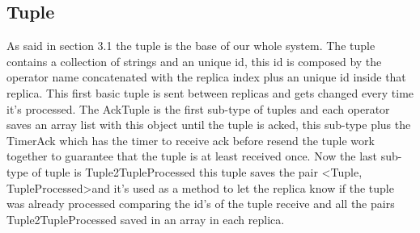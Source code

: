 \documentclass[times, 10pt, twocolumn]{article}
\begin{document}
\subsection{Tuple}
As said in section 3.1 the tuple is the base of our whole system. The tuple contains a collection of strings and an unique id, this id is composed by the operator name concatenated with the replica index plus an unique id inside that replica. This first basic tuple is sent between replicas and gets changed every time it's processed. The AckTuple is the first sub-type of tuples and each operator saves an array list with this object until the tuple is acked, this sub-type plus the TimerAck which has the timer to receive ack before resend the tuple work together to guarantee that the tuple is at least received once. Now the last sub-type of tuple is Tuple2TupleProcessed this tuple saves the pair \textless Tuple, TupleProcessed\textgreater and it's used as a method to let the replica know if the tuple was already processed comparing the id's of the tuple receive and all the pairs Tuple2TupleProcessed saved in an array in each replica.



\end{document}
